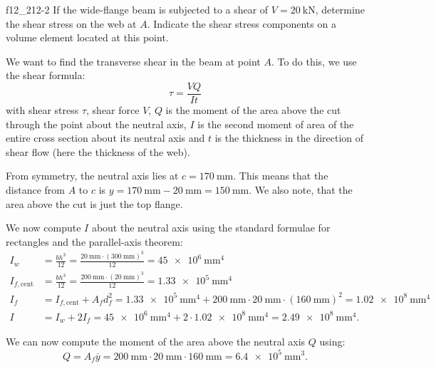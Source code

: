 
\begin{problemwithimage}{f12_2}{12-2}
  If the wide-flange beam is subjected to a shear of $V = \qty{20}{\kN}$, determine the shear stress on the web at $A$.
  Indicate the shear stress components on a volume element located at this point.
\end{problemwithimage}

\begin{derivation}
  We want to find the transverse shear in the beam at point $A$.
  To do this, we use the shear formula:
  \begin{equation*}
    \tau = \frac{VQ}{It}
  \end{equation*}
  with shear stress $\tau$, shear force $V$, $Q$ is the moment of the area above the cut through the point about the neutral axis, $I$ is the second moment of area of the entire cross section about its neutral axis and $t$ is the thickness in the direction of shear flow (here the thickness of the web).

  From symmetry, the neutral axis lies at $c = \qty{170}{\mm}$. This means that the distance from $A$ to $c$ is $y = \qty{170}{\mm} - \qty{20}{\mm} = \qty{150}{\mm}$. We also note, that the area above the cut is just the top flange.

  We now compute $I$ about the neutral axis using the standard formulae for rectangles and the parallel-axis theorem:
  \begin{align*}
    I_w &= \frac{bh^3}{12} = \frac{\qty{20}{\mm} \cdot \left( \qty{300}{\mm}  \right)^3}{12}  = \qty{45e6}{\mm^4}\\
    I_{f, \mathrm{cent}} &= \frac{bh^3}{12} = \frac{\qty{200}{\mm} \cdot \left( \qty{20}{\mm}  \right)^3}{12}  = \qty{1,33e5}{\mm^4}\\
    I_f &= I_{f, \mathrm{cent}} + A_f d_f^2 = \qty{1,33e5}{\mm^{4}}  + \qty{200}{\mm} \cdot \qty{20}{\mm} \cdot \left( \qty{160}{\mm}  \right)^2 = \qty{1,02e8}{\mm^{4}}  \\
    I &= I_w + 2 I_f = \qty{45e6}{\mm^{4}}  + 2 \cdot \qty{1,02e8}{\mm^{4}} = \qty{2,49e8}{\mm^{4}}
  .\end{align*}

  We can now compute the moment of the area above the neutral axis $Q$ using:
  \begin{equation*}
    Q = A_f \overline{y} = \qty{200}{\mm} \cdot \qty{20}{\mm} \cdot \qty{160}{\mm} = \qty{6,4e5}{\mm^{3}} 
  .\end{equation*}


\end{derivation}
